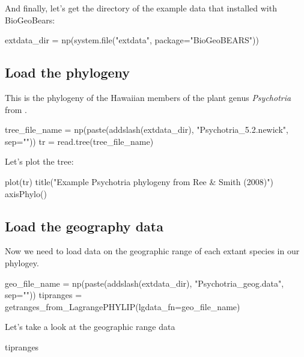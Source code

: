 \documentclass[11pt]{article}
\begin{document}
And finally, let's get the directory of the example data
that installed with BioGeoBears:
\begin{code}
extdata_dir = np(system.file("extdata", package="BioGeoBEARS"))
\end{code}

\subsection{Load the phylogeny}

This is the phylogeny of the
 Hawaiian members of the
plant genus \textit{Psychotria} 
from \citet{ree2008maximum}. 
\begin{code}
tree_file_name = np(paste(addslash(extdata_dir), "Psychotria_5.2.newick", sep=""))
tr = read.tree(tree_file_name)
\end{code}
Let's plot the tree:
\begin{code}
plot(tr)
title("Example Psychotria phylogeny from Ree & Smith (2008)")
axisPhylo()
\end{code}


\subsection{Load the geography data}

Now we need to load data on the geographic range of each extant
species in our phylogey.
\begin{code}
geo_file_name = np(paste(addslash(extdata_dir), "Psychotria_geog.data", sep=""))
tipranges = getranges_from_LagrangePHYLIP(lgdata_fn=geo_file_name)
\end{code}
Let's take a look at the geographic range data
\begin{code}
tipranges
\end{code}
\end{document}
